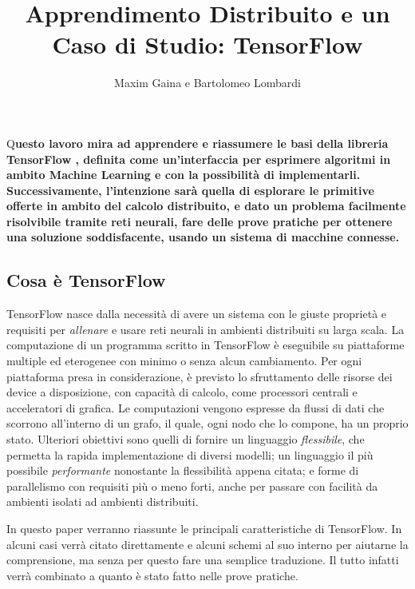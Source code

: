 \documentclass[DIV=calc, paper=a4, fontsize=11pt]{scrartcl}	 %
\title{Apprendimento Distribuito e un Caso di Studio: TensorFlow} %
\author{Maxim Gaina e Bartolomeo Lombardi} %
\date{} %
\newcommand{\initial}[1]{ %
\lettrine[lines=3,lhang=0.3,nindent=0em]{
\color{DarkGoldenrod}
{\textsf{#1}}}{}}
\begin{document}
	\maketitle
	\thispagestyle{fancy}
	\initial{Q}\textbf{uesto lavoro mira ad apprendere e riassumere le basi della libreria TensorFlow \cite{tf}, definita come un'interfaccia per esprimere algoritmi in ambito Machine Learning e con la possibilità di implementarli. Successivamente, l'intenzione sarà quella di esplorare le primitive offerte in ambito del calcolo distribuito, e dato un problema facilmente risolvibile tramite reti neurali, fare delle prove pratiche per ottenere una soluzione soddisfacente, usando un sistema di macchine connesse.}
	
	\begin{multicols}{2}
		\tableofcontents
		\section*{Cosa è TensorFlow}
			TensorFlow nasce dalla necessità di avere un sistema con le giuste proprietà e requisiti per \textit{allenare} e usare reti neurali in ambienti distribuiti su larga scala. La computazione di un programma scritto in TensorFlow è eseguibile su piattaforme multiple ed eterogenee con minimo o senza alcun cambiamento. Per ogni piattaforma presa in considerazione, è previsto lo sfruttamento delle risorse dei device a disposizione, con capacità di calcolo, come processori centrali e acceleratori di grafica. Le computazioni vengono espresse da flussi di dati che scorrono all'interno di un grafo, il quale, ogni nodo che lo compone, ha un proprio stato. Ulteriori obiettivi sono quelli di fornire un linguaggio \textit{flessibile}, che permetta la rapida implementazione di diversi modelli; un linguaggio il più possibile \textit{performante} nonostante la flessibilità appena citata; e forme di parallelismo con requisiti più o meno forti, anche per passare con facilità da ambienti isolati ad ambienti distribuiti.
			
			In questo paper verranno riassunte le principali caratteristiche di TensorFlow. In alcuni casi verrà citato direttamente \cite{tf} e alcuni schemi al suo interno per aiutarne la comprensione, ma senza per questo fare una semplice traduzione. Il tutto infatti verrà combinato a quanto è stato fatto nelle prove pratiche.
			

\end{multicols}
\end{document}
